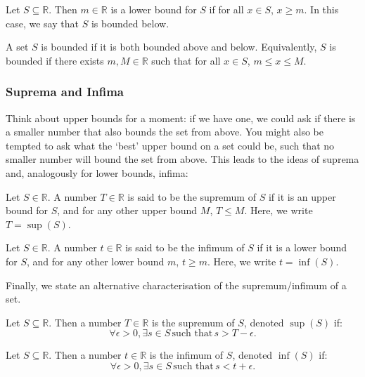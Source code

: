 \documentclass[
  17pt,
  a4paper]{extarticle}
\theoremstyle{plain}
\theoremstyle{definition}
\theoremstyle{plain}
\theoremstyle{plain}
\theoremstyle{plain}
\theoremstyle{plain}
\theoremstyle{definition}
\theoremstyle{definition}
\theoremstyle{remark}
\theoremstyle{remark}
\let\BeginKnitrBlock\begin \let\EndKnitrBlock\end
\renewcommand{\;}{\,}
\begin{document}
\BeginKnitrBlock{definition}[Lower Bound]
{\label{def:def7} }Let \(S \subseteq \mathbb{R}\). Then \(m \in \mathbb{R}\) is a lower bound for \(S\) if for all \(x \in S\), \(x \geq m\). In this case, we say that \(S\) is bounded below.
\EndKnitrBlock{definition}

\BeginKnitrBlock{definition}[Bounded Set]
{\label{def:def8} }A set \(S\) is bounded if it is both bounded above and below. Equivalently, \(S\) is bounded if there exists \(m, M \in \mathbb{R}\) such that for all \(x \in S\), \(m\leq x \leq M\).
\EndKnitrBlock{definition}

\hypertarget{suprema-and-infima}{%
\subsubsection{Suprema and Infima}\label{suprema-and-infima}}

Think about upper bounds for a moment: if we have one, we could ask if there is a smaller number that also bounds the set from above. You might also be tempted to ask what the `best' upper bound on a set could be, such that no smaller number will bound the set from above. This leads to the ideas of suprema and, analogously for lower bounds, infima:

\BeginKnitrBlock{definition}[Supremum]
{\label{def:def9} }Let \(S \in \mathbb{R}\). A number \(T \in \mathbb{R}\) is said to be the supremum of \(S\) if it is an upper bound for \(S\), and for any other upper bound \(M\), \(T \leq M\). Here, we write \(T = \sup(S)\).
\EndKnitrBlock{definition}

\BeginKnitrBlock{definition}[Infimum]
{\label{def:def10} }Let \(S \in \mathbb{R}\). A number \(t \in \mathbb{R}\) is said to be the infimum of \(S\) if it is a lower bound for \(S\), and for any other lower bound \(m\), \(t\geq m\). Here, we write \(t = \inf(S)\).
\EndKnitrBlock{definition}

Finally, we state an alternative characterisation of the supremum/infimum of a set.
\BeginKnitrBlock{proposition}
{\label{prp:prop2} }Let \(S\subseteq\mathbb{R}\). Then a number \(T\in\mathbb{R}\) is the supremum of \(S\), denoted \(\sup(S)\) if: \[\forall \epsilon > 0, \exists s \in S\; \text{such that} \; s > T - \epsilon.\]
\EndKnitrBlock{proposition}

\BeginKnitrBlock{proposition}
{\label{prp:prop3} }Let \(S\subseteq\mathbb{R}\). Then a number \(t\in\mathbb{R}\) is the infimum of \(S\), denoted \(\inf(S)\) if: \[\forall \epsilon > 0, \exists s \in S\; \text{such that} \; s < t + \epsilon.\]
\EndKnitrBlock{proposition}
\end{document}
